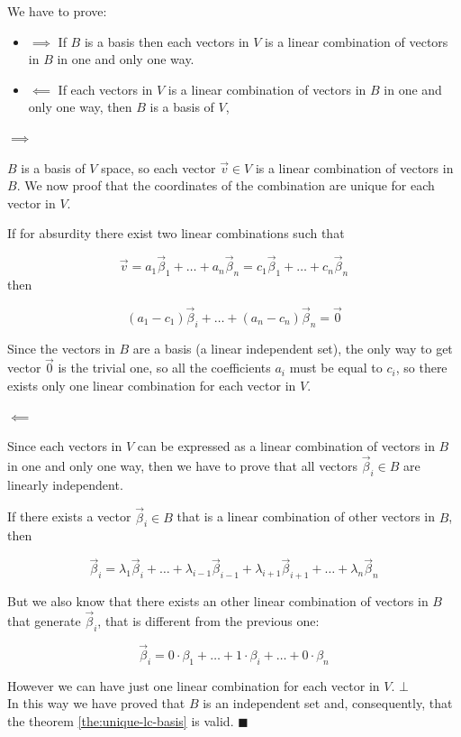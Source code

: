 \begin{tcolorbox}[colback=def_color,coltitle=black,coltext=black,colframe=pro_color_back,title=\textbf{Proof}]

We have to prove:
\begin{itemize}
    \item $\implies$ If $B$ is a basis then each vectors in $V$ is a linear combination of vectors in $B$ in one and only one way.
    \item $\impliedby$ If each vectors in $V$ is a linear combination of vectors in $B$ in one and only one way, then $B$ is a basis of $V$,
\end{itemize}

$\implies$

$B$ is a basis of $V$ space, so each vector $\vec v \in V$ is a linear combination of vectors in $B$. We now proof that the coordinates of the combination are unique for each vector in $V$.

If for absurdity there exist two linear combinations such that

$$
\vec v = a_1 \vec \beta_1 + \dots + a_n \vec \beta_n = c_1 \vec \beta_1 + \dots + c_n \vec \beta_n
$$
then

$$
(a_1 - c_1) \vec \beta_i + \dots + (a_n - c_n) \vec \beta_n = \vec 0
$$

Since the vectors in $B$ are a basis (a linear independent set), the only way to get vector $\vec 0$ is the trivial one, so all the coefficients $a_i$ must be equal to $c_i$, so there exists only one linear combination for each vector in $V$.

$\impliedby$

Since each vectors in $V$ can be expressed as a linear combination of vectors in $B$ in one and only one way, then we have to prove that all vectors $\vec \beta_i \in B$ are linearly independent.

If there exists a vector $\vec \beta_i \in B$ that is a linear combination of other vectors in $B$, then

$$
\vec \beta_i = \lambda_1 \vec \beta_i + \dots + \lambda_{i-1} \vec \beta_{i-1} + \lambda_{i+1} \vec \beta_{i+1} + \dots + \lambda_n \vec \beta_n
$$

But we also know that there exists an other linear combination of vectors in $B$ that generate $\vec \beta_i$, that is different from the previous one:

$$
\vec \beta_i = 0 \cdot \beta_1 + \dots + 1 \cdot \beta_i + \dots + 0 \cdot \beta_n
$$

However we can have just one linear combination for each vector in $V$. $\bot$
\\

In this way we have proved that $B$ is an independent set and, consequently, that the theorem \ref{the:unique-lc-basis} is valid. $\blacksquare$
\end{tcolorbox}

